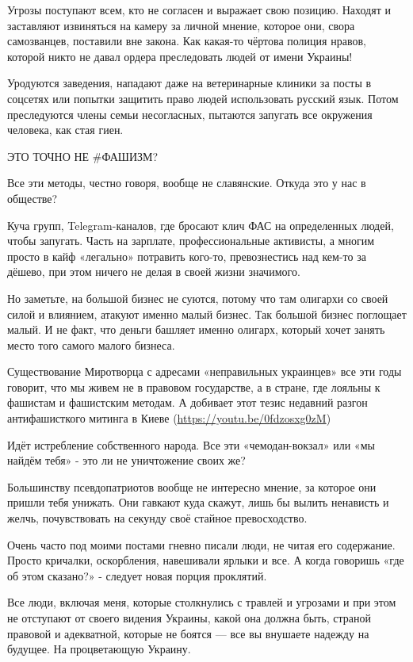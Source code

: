 Угрозы поступают всем, кто не согласен и выражает свою позицию. Находят и
заставляют извиняться на камеру за личной мнение, которое они, свора
самозванцев, поставили вне закона. Как какая-то чёртова полиция нравов, которой
никто не давал ордера преследовать людей от имени Украины!

Уродуются заведения, нападают даже на ветеринарные клиники за посты в соцсетях
или попытки защитить право людей использовать русский язык. Потом преследуются
члены семьи несогласных, пытаются запугать все окружения человека, как стая
гиен. 

ЭТО ТОЧНО НЕ #ФАШИЗМ?

Все эти методы, честно говоря, вообще не славянские. Откуда это у нас в
обществе? 

Куча групп, Telegram-каналов, где бросают клич ФАС на определенных людей, чтобы
запугать. Часть на зарплате, профессиональные активисты, а многим просто в кайф
«легально» потравить кого-то, превознестись над кем-то за дёшево, при этом
ничего не делая в своей жизни значимого. 

Но заметьте, на большой бизнес не суются, потому что там олигархи со своей
силой и влиянием, атакуют именно малый бизнес. Так большой бизнес поглощает
малый. И не факт, что деньги башляет именно олигарх, который хочет занять место
того самого малого бизнеса.

Существование Миротворца с адресами «неправильных украинцев» все эти годы
говорит, что мы живем не в правовом государстве, а в стране, где лояльны к
фашистам и фашистским методам. А добивает этот тезис недавний разгон
антифашисткого митинга в Киеве (\url{https://youtu.be/0fdzosxg0zM})

Идёт истребление собственного народа. Все эти «чемодан-вокзал» или «мы найдём
тебя» - это ли не уничтожение своих же? 

Большинству псевдопатриотов вообще не интересно мнение, за которое они пришли
тебя унижать. Они гавкают куда скажут, лишь бы вылить ненависть и желчь,
почувствовать на секунду своё стайное превосходство. 

Очень часто под моими постами гневно писали люди, не читая его содержание.
Просто кричалки, оскорбления, навешивали ярлыки и все. А когда говоришь «где об
этом сказано?» - следует новая порция проклятий.

Все люди, включая меня, которые столкнулись с травлей и угрозами и при этом не
отступают от своего видения Украины, какой она должна быть, страной правовой и
адекватной, которые не боятся — все вы внушаете надежду на будущее. На
процветающую Украину.


